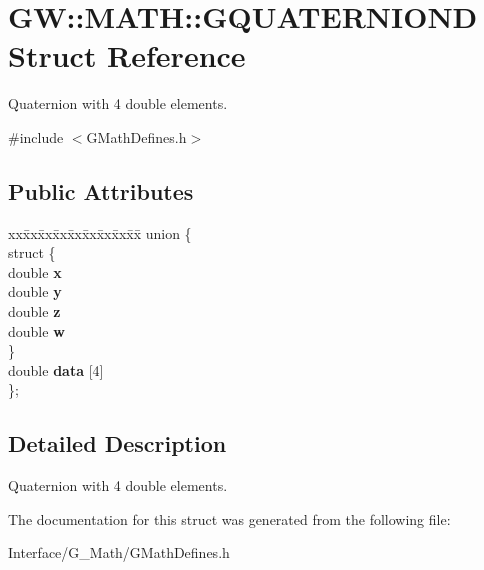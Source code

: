 \hypertarget{structGW_1_1MATH_1_1GQUATERNIOND}{}\section{GW\+::M\+A\+TH\+::G\+Q\+U\+A\+T\+E\+R\+N\+I\+O\+ND Struct Reference}
\label{structGW_1_1MATH_1_1GQUATERNIOND}


Quaternion with 4 double elements.  




{\ttfamily \#include $<$G\+Math\+Defines.\+h$>$}

\subsection*{Public Attributes}
\begin{DoxyCompactItemize}
\item 
\mbox{\label{structGW_1_1MATH_1_1GQUATERNIOND_ae549f754f2f182bce994f6e7f1daf553}} 
\begin{tabbing}
xx\=xx\=xx\=xx\=xx\=xx\=xx\=xx\=xx\=\kill
union \{\\
\mbox{\label{unionGW_1_1MATH_1_1GQUATERNIOND_1_1_0D24_ae5bbc9fad6ef88c3f9c1a5171c52741d}} 
\>struct \{\\
\>\>double {\bfseries x}\\
\>\>double {\bfseries y}\\
\>\>double {\bfseries z}\\
\>\>double {\bfseries w}\\
\>\} \\
\>double {\bfseries data} \mbox{[}4\mbox{]}\\
\}; \\

\end{tabbing}\end{DoxyCompactItemize}


\subsection{Detailed Description}
Quaternion with 4 double elements. 

The documentation for this struct was generated from the following file\+:\begin{DoxyCompactItemize}
\item 
Interface/\+G\+\_\+\+Math/G\+Math\+Defines.\+h\end{DoxyCompactItemize}
